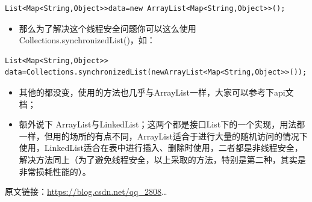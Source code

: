\documentclass[9pt, b5paper]{article}
\begin{document}
\begin{verbatim}
List<Map<String,Object>>data=new ArrayList<Map<String,Object>>();
\end{verbatim}
\begin{itemize}
\item 那么为了解决这个线程安全问题你可以这么使用Collections.synchronizedList()，如：
\end{itemize}
\begin{verbatim}
List<Map<String,Object>> data=Collections.synchronizedList(newArrayList<Map<String,Object>>());
\end{verbatim}
\begin{itemize}
\item 其他的都没变，使用的方法也几乎与ArrayList一样，大家可以参考下api文档；
\item 额外说下 ArrayList与LinkedList；这两个都是接口List下的一个实现，用法都一样，但用的场所的有点不同，ArrayList适合于进行大量的随机访问的情况下使用，LinkedList适合在表中进行插入、删除时使用，二者都是非线程安全，解决方法同上（为了避免线程安全，以上采取的方法，特别是第二种，其实是非常损耗性能的）。
\end{itemize}
原文链接：\url{https://blog.csdn.net/qq_2808}\ldots{}
\end{document}
